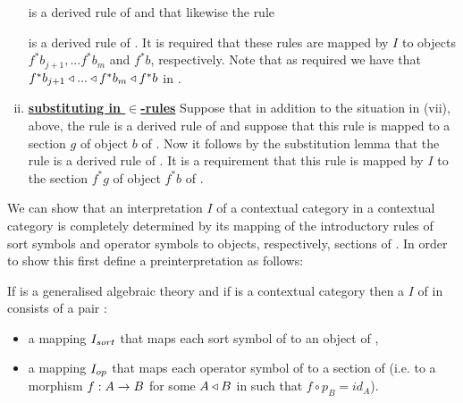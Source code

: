 \begin{enumerate}[(i)]
 is a derived rule of \gatUw and that likewise the rule

 is a derived rule of \gatU.
It is required that these rules are mapped by $I$ to objects $f^*b_{j+1},...f^*b_m$ and $f^*b$, respectively.
Note that as required we have that $f^*b_{j+1}\triangleleft ... \triangleleft f^*b_m \triangleleft f^*b$ in \catc.

\item \underline{\textbf{substituting in $\boldsymbol {\in}$-rules}} 
Suppose that in addition to the situation in (vii), above, the rule
is a derived rule of \gatUw and suppose that this rule is mapped to a section $g$ of object $b$ of \catc.
Now it follows by the substitution lemma that the rule
is a derived rule of \gatU.
It is a requirement that this rule is mapped by $I$ to the section $f^*g$ of object $f^*b$ of \catc.
\end{enumerate}


\note
We can show that an interpretation $I$ of a contextual category \gatUw in a contextual category \catcw is
completely determined by its mapping of the introductory rules of sort symbols and operator symbols to
objects, respectively, sections of \catc. In order to show this first define a preinterpretation as follows:
\begin{definition}
If \gatUw is a generalised algebraic theory  and if \catcw is a contextual category then
a  $I$ of  \gatU in \catcw consists of a pair :
\begin{itemize}
\item a mapping $I_{sort}$ that maps each sort symbol of \gatUw to  an object of \catc,
\item a mapping $I_{op}$ that maps each operator symbol of \gatUw to a section of \catcw (i.e. to a morphism $f: A \rightarrow B$ for some 
$A \triangleleft B$ in \catcw such that $f \circ p_B=id_A$).
\end{itemize}
\end{definition}













